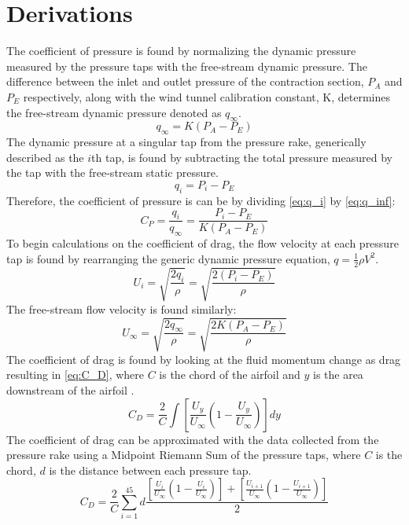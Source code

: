 \section{Derivations} \label{sec:derivations}
The coefficient of pressure is found by normalizing the dynamic pressure measured by the pressure taps with the free-stream dynamic pressure. The difference between the inlet and outlet pressure of the contraction section, $P_A$ and $P_E$ respectively, along with the wind tunnel calibration constant, K, determines the free-stream dynamic pressure denoted as $q_\infty$.
\begin{equation}\label{eq:q_inf}
    q_\infty = K (P_A - P_E)
\end{equation}
The dynamic pressure at a singular tap from the pressure rake, generically described as the $i$th tap, is found by subtracting the total pressure measured by the tap with the free-stream static pressure.
\begin{equation}\label{eq:q_i}
    q_i = P_i - P_E 
\end{equation}
Therefore, the coefficient of pressure is can be by dividing \autoref{eq:q_i} by \autoref{eq:q_inf}:
\begin{equation}\label{eq:C_P}
    C_P = \frac{q_i}{q_\infty} = \frac{P_i - P_E }{K (P_A - P_E)}
\end{equation}
To begin calculations on the coefficient of drag, the flow velocity at each pressure tap is found by rearranging the generic dynamic pressure equation, $q = \frac{1}{2}\rho V^2$.
\begin{equation}\label{eq:U_i}
    U_i = \sqrt{\frac{2 q_i}{\rho}} = \sqrt{\frac{2 (P_i - P_E)}{\rho}}
\end{equation}
The free-stream flow velocity is found similarly: 
\begin{equation}\label{eq:U_inf}
    U_\infty = \sqrt{\frac{2 q_\infty}{\rho}} = \sqrt{\frac{2 K (P_A - P_E)}{\rho}}
\end{equation}
The coefficient of drag is found by looking at the fluid momentum change as drag resulting in \autoref{eq:C_D}, where $C$ is the chord of the airfoil and $y$ is the area downstream of the airfoil \citep{lab6-manual}.
\begin{equation}\label{eq:C_D}
    C_D = \frac{2}{C} \int [\frac{U_y}{U_\infty}(1-\frac{U_y}{U_\infty})]dy
\end{equation}
The coefficient of drag can be approximated with the data collected from the pressure rake using a Midpoint Riemann Sum of the pressure taps, where $C$ is the chord, $d$ is the distance between each pressure tap.
\begin{equation}
    C_D = \frac{2}{C} \sum_{i=1}^{45} d\frac{[\frac{U_i}{U_\infty}(1-\frac{U_i}{U_\infty})] + [\frac{U_{i+1}}{U_\infty}(1-\frac{U_{i+1}}{U_\infty})]}{2}
\end{equation}


